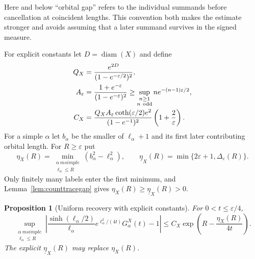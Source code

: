 \documentclass[11pt,a4paper]{article}
\numberwithin{equation}{section}
\newtheorem{proposition}[theorem]{Proposition}
\theoremstyle{definition}
\theoremstyle{remark}
\begin{document}
Here and below ``orbital gap'' refers to the individual summands
before cancellation at coincident lengths. This convention both
makes the estimate stronger and avoids assuming that a later
summand survives in the signed measure.

For explicit constants let $D=\operatorname{diam}(X)$ and define
\begin{align}
 Q_X&=\frac{e^{2D}}{(1-e^{-\varepsilon/2})^2},\notag\\
 A_\varepsilon&=\frac{1+e^{-\varepsilon}}{(1-e^{-\varepsilon})^2}
       \geq\sup_{\substack{n\geq1\\n\ {\rm odd}}}
             n e^{-(n-1)\varepsilon/2},\notag\\
 C_X&=\frac{Q_X A_\varepsilon\coth(\varepsilon/2)e^2}
               {(1-e^{-1})^2}\left(1+\frac2\varepsilon\right).
 \label{eq:countuniformconstants}
\end{align}
For a simple $\alpha$ let $b_\alpha$ be the smaller of
$\ell_\alpha+1$ and its first later contributing orbital length.
For $R\geq\varepsilon$ put
\[
 \eta_X(R)=\min_{\substack{\alpha\ {
m simple}\\\ell_\alpha\leq R}}
             (b_\alpha^2-\ell_\alpha^2),\qquad
 \underline\eta_X(R)=
             \min\{2\varepsilon+1,\Delta_\varepsilon(R)\}.
\]
Only finitely many labels enter the first minimum, and
Lemma~\ref{lem:counttracegap} gives
$\eta_X(R)\geq\underline\eta_X(R)>0$.

\begin{proposition}[Uniform recovery with explicit constants]
\label{prop:countuniformisolation}
For $0<t\leq\varepsilon/4$,
\begin{equation}
 \boxed{
 \sup_{\substack{\alpha\ {
m simple}\\\ell_\alpha\leq R}}
 \left|
   \frac{\sinh(\ell_\alpha/2)}{\ell_\alpha}
   e^{\ell_\alpha^2/(4t)}G_\alpha^X(t)-1
 \right|
 \leq C_X\exp\!\left(R-\frac{\eta_X(R)}{4t}\right).
 }
 \label{eq:countuniformisolation}
\end{equation}
The explicit $\underline\eta_X(R)$ may replace $\eta_X(R)$.
\end{proposition}
\end{document}
